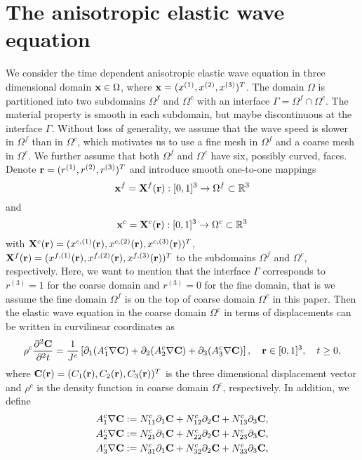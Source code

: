 \section{The anisotropic elastic wave equation }
We consider the time dependent anisotropic elastic wave equation in three dimensional domain ${\bf x}\in\Omega$, where ${\bf x} = (x^{(1)},x^{(2)},x^{(3)})^T$. 
The domain $\Omega$ is partitioned into two subdomains $\Omega^f$ and $\Omega^c$ with an interface $\Gamma = \Omega^f\cap\Omega^c$. The material property is smooth in each subdomain, but maybe discontinuous at the interface $\Gamma$. Without loss of generality, we assume that the wave speed is slower in $\Omega^f$ than in $\Omega^c$, which motivates us to use a fine mesh in $\Omega^f$ and a coarse mesh in $\Omega^c$.  We further assume that both $\Omega^f$ and $\Omega^c$ have six, possibly curved, faces. Denote ${\bf r} = (r^{(1)},r^{(2)},r^{(3)})^T$ and  introduce smooth one-to-one mappings 
\[{\bf x}^{f} = {\bf X}^{f}({\bf r}) :  [0,1]^3 \rightarrow \Omega^{f} \subset \mathbb{R}^3 \]
and 
\[{\bf x}^{c} = {\bf X}^{c}({\bf r}) :  [0,1]^3 \rightarrow \Omega^{c} \subset \mathbb{R}^3\]
with ${\bf X}^{c}({\bf r}) = (x^{c,(1)}({\bf r}),x^{c,(2)}({\bf r}),x^{c,(3)}({\bf r}))^T$, ${\bf X}^{f}({\bf r}) = (x^{f,(1)}({\bf r}),x^{f,(2)}({\bf r}),x^{f,(3)}({\bf r}))^T$ to the subdomains $\Omega^f$ and $\Omega^c$,  respectively. Here, we want to mention that the interface $\Gamma$ corresponds to $r^{(3)} = 1$ for the coarse domain and $r^{(3)} = 0$ for the fine domain, that is we assume the fine domain $\Omega^f$ is on the top of coarse domain $\Omega^c$ in this paper. Then the elastic wave equation in the coarse domain $\Omega^c$ in terms of displacements can be written in curvilinear coordinates as
\begin{align}\label{elastic_curvi}
	\rho^c\frac{\partial^2{\bf C}}{\partial^2 t} = \frac{1}{J^c}\left[\partial_1(A_1^c\nabla{\bf C}) + \partial_2(A_2^c\nabla{\bf C}) +\partial_3(A_3^c\nabla{\bf C}) \right],\ \ \  {\bf r}\in[0,1]^3,\ \ \  t\geq0,
\end{align}
where ${\bf C}({\bf r}) = (C_1({\bf r}),C_2({\bf r}),C_3({\bf r}))^T$ is the three dimensional displacement vector and $\rho^c$ is the density function in coarse domain $\Omega^c$, respectively. In addition, we define
\begin{align*} 
	A_1^c\nabla{\bf C} &:= N_{11}^c\partial_1{\bf C} + N_{12}^c\partial_2{\bf C} + N_{13}^c\partial_3{\bf C}, \\
	A_2^c\nabla{\bf C} &:= N_{21}^c\partial_1{\bf C} + N_{22}^c\partial_2{\bf C} + N_{23}^c\partial_3{\bf C}, \\
	A_3^c\nabla{\bf C} &:= N_{31}^c\partial_1{\bf C} + N_{32}^c\partial_2{\bf C} + N_{33}^c\partial_3{\bf C},
\end{align*}
